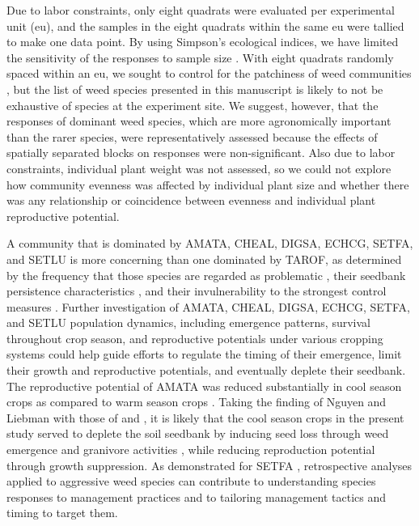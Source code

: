 \documentclass[
]{article}
\begin{document}
Due to labor constraints, only eight quadrats were evaluated per experimental unit (eu), and the samples in the eight quadrats within the same eu were tallied to make one data point. By using Simpson's ecological indices, we have limited the sensitivity of the responses to sample size \citep{nkoaWeedAbundanceDistribution2015}. With eight quadrats randomly spaced within an eu, we sought to control for the patchiness of weed communities \citep{cardinaNatureConsequenceWeed1997}, but the list of weed species presented in this manuscript is likely to not be exhaustive of species at the experiment site. We suggest, however, that the responses of dominant weed species, which are more agronomically important than the rarer species, were representatively assessed because the effects of spatially separated blocks on responses were non-significant. Also due to labor constraints, individual plant weight was not assessed, so we could not explore how community evenness was affected by individual plant size and whether there was any relationship or coincidence between evenness and individual plant reproductive potential.

A community that is dominated by AMATA, CHEAL, DIGSA, ECHCG, SETFA, and SETLU is more concerning than one dominated by TAROF, as determined by the frequency that those species are regarded as problematic \citep{krugerGrowerViewsProblematic2009, princeBenchmarkStudyIntroduction2012}, their seedbank persistence characteristics \citep{buhlerEmergencePersistenceSeed2001, davisEnvironmentalFactorsAffecting2005}, and their invulnerability to the strongest control measures \citep{mohlerWeedEvolutionCommunity2001, culpepperGlyphosateinducedWeedShifts2006}. Further investigation of AMATA, CHEAL, DIGSA, ECHCG, SETFA, and SETLU population dynamics, including emergence patterns, survival throughout crop season, and reproductive potentials under various cropping systems could help guide efforts to regulate the timing of their emergence, limit their growth and reproductive potentials, and eventually deplete their seedbank. The reproductive potential of AMATA was reduced substantially in cool season crops as compared to warm season crops \citet{nguyenImpactCroppingSysteminreview}. Taking the finding of Nguyen and Liebman with those of \citet{gabaAgroecologicalWeedControl2014} and \citet{weisbergerDoesDiversifyingCrop2019}, it is likely that the cool season crops in the present study served to deplete the soil seedbank by inducing seed loss through weed emergence and granivore activities \citep{vanderlaatPostdispersalWeedSeed2015}, while reducing reproduction potential through growth suppression. As demonstrated for SETFA \citep{davisCroppingSystemEffects2003a}, retrospective analyses applied to aggressive weed species can contribute to understanding species responses to management practices and to tailoring management tactics and timing to target them.
\end{document}
